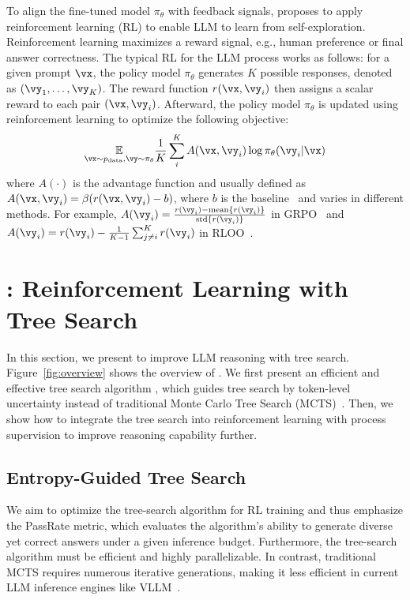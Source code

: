To align the fine-tuned model \(\pi_\theta\) with feedback signals, \citet{ouyang2022training} proposes to apply reinforcement learning (RL) to enable LLM to learn from self-exploration.
Reinforcement learning maximizes a reward signal, e.g., human preference or final answer correctness.
The typical RL for the LLM process works as follows: for a given prompt \(\vx\), the policy model \(\pi_\theta\) generates \(K\) possible responses, denoted as \((\vy_1, \dots, \vy_K)\). The reward function $r(\vx, \vy_i)$ then assigns a scalar reward to each pair \((\vx, \vy_i)\). Afterward, the policy model \(\pi_\theta\) is updated using reinforcement learning to optimize the following objective:
\begin{equation}
    \underset{\vx \sim p_{\text{data}}, \vy \sim \pi_\theta}{\mathbb{E}} \frac{1}{K} \sum_i^{K}  A(\vx, \vy_i) \log \pi_{\theta}(\vy_i|\vx)
    \label{eq:rl_target}
\end{equation}
where $A(\cdot)$ is the advantage function and usually defined as $A(\vx, \vy_i) = \beta(r(\vx, \vy_i) - b)$, where $b$ is the baseline~\cite{mei2022role,chung2021beyond} and varies in different methods. For example, $A(\vy_i) = \frac{r(\vy_i) - \text{mean}\{r(\vy_i)\}}{\text{std}\{r(\vy_i)\}}$ in GRPO~\cite{shao2024deepseekmath} and $A(\vy_i) = r(\vy_i) - \frac{1}{K-1}\sum_{j\neq i}^K r(\vy_i)$ in RLOO~\cite{ahmadian2024rloo}.



\section{\model: Reinforcement Learning with Tree Search}
In this section, we present \model to improve LLM reasoning with tree search. Figure~\ref{fig:overview} shows the overview of \model. We first present an efficient and effective tree search algorithm \treemodel, which guides tree search by token-level uncertainty instead of traditional Monte Carlo Tree Search (MCTS)~\citep{browne2012mctssurvey}. Then, we show how to integrate the tree search into reinforcement learning with process supervision to improve reasoning capability further.

\subsection{Entropy-Guided Tree Search}
\label{sec:entropy-tree}
We aim to optimize the tree-search algorithm for RL training and thus emphasize the PassRate metric, which evaluates the algorithm's ability to generate diverse yet correct answers under a given inference budget. Furthermore, the tree-search algorithm must be efficient and highly parallelizable. In contrast, traditional MCTS requires numerous iterative generations, making it less efficient in current LLM inference engines like VLLM~\citep{kwon2023efficient}.

